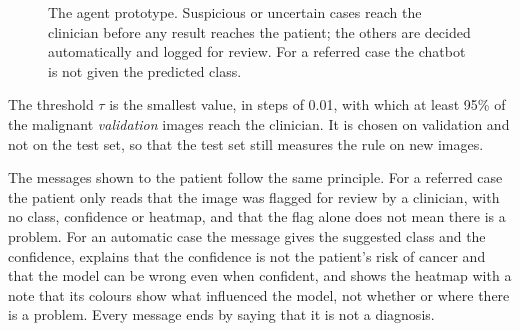\documentclass{article}
\begin{document}
\begin{figure}[t]
\centering
{}
\caption{The agent prototype. Suspicious or uncertain cases reach the clinician before any
result reaches the patient; the others are decided automatically and logged for review. For
a referred case the chatbot is not given the predicted class.}
\label{fig:agent}
\end{figure}

The threshold $\tau$ is the smallest value, in steps of 0.01, with which at least 95\% of
the malignant \emph{validation} images reach the clinician. It is chosen on validation and
not on the test set, so that the test set still measures the rule on new images.

The messages shown to the patient follow the same principle. For a referred case the patient
only reads that the image was flagged for review by a clinician, with no class, confidence or
heatmap, and that the flag alone does not mean there is a problem. For an automatic case the
message gives the suggested class and the confidence, explains that the confidence is not the
patient's risk of cancer and that the model can be wrong even when confident, and shows the
heatmap with a note that its colours show what influenced the model, not whether or where
there is a problem. Every message ends by saying that it is not a diagnosis.
\end{document}
